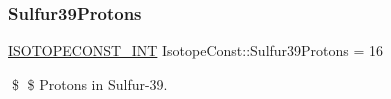 \subsubsection{\texorpdfstring{Sulfur39\+Protons}{Sulfur39Protons}}
{\footnotesize\ttfamily \mbox{\hyperlink{group___isotope_const-_macros_ga5f18360b3e99483a35c32d789e62621c}{I\+S\+O\+T\+O\+P\+E\+C\+O\+N\+S\+T\+\_\+\+I\+NT}} Isotope\+Const\+::\+Sulfur39\+Protons = 16}

\$ \$ Protons in Sulfur-\/39. 